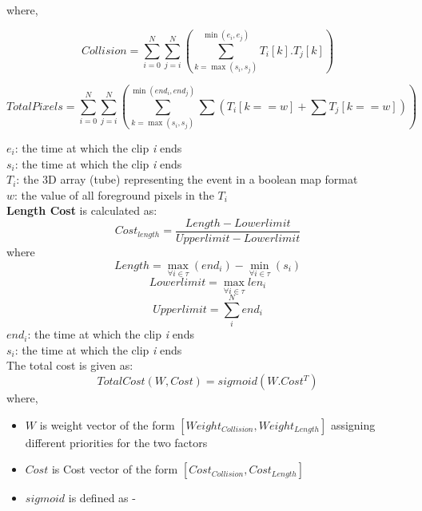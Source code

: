 \begin{itemize}
    where,

    \begin{equation}\label{eqn:coll}
    Collision = \sum_{i=0}^{N}\sum_{j=i}^{N} \left(\sum_{k=\max(s_{i},s_{j})}^{\min(e_{i}, e_{j})}T_{i}[k].T_{j}[k]\right)
    \end{equation}

    \begin{equation}\label{eqn:totalp}
    TotalPixels = \sum_{i=0}^{N}\sum_{j=i}^{N} \left(
        \sum_{k=\max(s_{i},s_{j})}^{\min(end_{i}, end_{j})}
        \sum \left(T_{i}[k==w] + \sum T_{j}[k==w]\right) \right)
    \end{equation}

    \(e_{i}\): the time at which the clip \textit{i} ends\\
    \(s_{i}\): the time at which the clip \textit{i} ends\\
    \(T_{i}\): the 3D array (tube) representing the event in a boolean map format\\
    \(w\): the value of all foreground pixels in the \(T_{i}\)\\

    \textbf{Length Cost} is calculated as:
    \begin{equation} \label{eqn:costlen}
    Cost_{length} = \frac{ Length - Lowerlimit}{ Upperlimit - Lowerlimit}
    \end{equation}
    where
    \begin{equation} \label{eqn:len}
    Length = \max_{\forall i \in \tau}(end_{i}) - \min_{\forall i \in \tau}(s_{i})
    \end{equation}
    \begin{equation} \label{eqn:lowerlim}
    Lowerlimit = \max_{\forall i \in \tau}len_{i}
    \end{equation}
    \begin{equation} \label{eqn:upperlim}
    Upperlimit = \sum_{i}^{N}end_{i}
    \end{equation}
    \(end_{i}\): the time at which the clip \textit{i} ends\\
    \(s_{i}\): the time at which the clip \textit{i} ends\\

    The total cost is given as:
    \begin{equation} \label{eqn:totalCost}
    TotalCost(W, Cost) = sigmoid(W.Cost^{T})
    \end{equation}
    where,
    \begin{itemize}
        \item \(W\) is weight vector of the form \([ Weight_{Collision}, Weight_{Length} ]\) assigning different priorities for the two factors
        \item \(Cost\) is Cost vector of the form \([ Cost_{Collision}, Cost_{Length} ]\)
        \item \(sigmoid\) is defined as - \\


\end{itemize}
\end{itemize}
